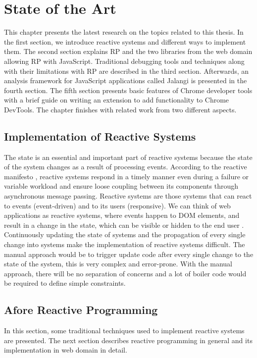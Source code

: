 \chapter{State of the Art} \label{chap:State of the Art}
This chapter presents the latest research on the topics related to this thesis. In the first section, we introduce reactive systems and different ways to implement them. The second section explains RP and the two libraries from the web domain allowing RP with JavaScript. Traditional debugging tools and techniques along with their limitations with RP are described in the third section. Afterwards, an analysis framework for JavaScript applications called Jalangi is presented in the fourth section. The fifth section presents basic features of Chrome developer tools with a brief guide on writing an extension to add functionality to Chrome DevTools. The chapter finishes with related work from two different aspects.

\section{Implementation of Reactive Systems}
The state is an essential and important part of reactive systems because the state of the system changes as a result of processing events. According to the reactive manifesto \cite{reactiveManifesto}, reactive systems respond in a timely manner even during a failure or variable workload and ensure loose coupling between its components through asynchronous message passing.
Reactive systems are those systems that can react to events (event-driven) and to its users (responsive). We can think of web applications as reactive systems, where events happen to DOM \cite{W3DOM} elements, and result in a change in the state, which can be visible or hidden to the end user \cite{Zanarini:2014:MRS:2637113.2637120}.
Continuously updating the state of systems and the propagation of every single change into systems make the implementation of reactive systems difficult. The manual approach would be to trigger update code after every single change to the state of the system, this is very complex and error-prone. With the manual approach, there will be no separation of concerns and a lot of boiler code would be required to define simple constraints.

\iffalse
\section{Afore Reactive Programming}
In this section, some traditional techniques used to implement reactive systems are presented. The next section describes reactive programming in general and its implementation in web domain in detail.



